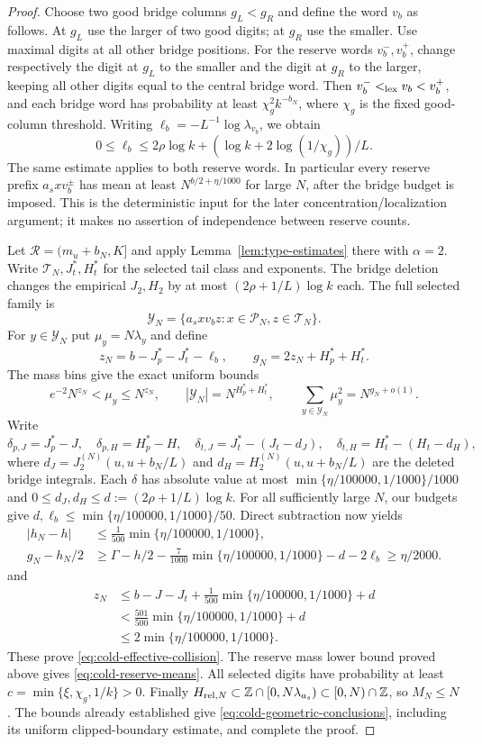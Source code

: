 \documentclass[11pt]{article}
\numberwithin{equation}{section}
\theoremstyle{definition}
\theoremstyle{remark}
\newcommand{\1}{\mathbf 1}
\begin{document}
\begin{proof}
Choose two good bridge columns $g_L<g_R$ and define the word $v_b$ as follows.
At $g_L$ use the larger of two good digits; at $g_R$ use the smaller.
Use maximal digits at all other bridge positions.
For the reserve words $v_b^-,v_b^+$, change respectively the digit at
$g_L$ to the smaller and the digit at $g_R$ to the larger, keeping all
other digits equal to the central bridge word.
Then $v_b^-<_{\rm lex}v_b<v_b^+$, and each bridge word has probability at least
$\chi_g^2k^{-b_N}$, where $\chi_g$ is the fixed good-column threshold.
Writing $\ell_b=-L^{-1}\log\lambda_{v_b}$, we obtain
\[
 0\le\ell_b\le 2\rho\log k+(\log k+2\log(1/\chi_g))/L.
\]
The same estimate applies to both reserve words.  In particular every
reserve prefix $a_sxv_b^\pm$ has mean at least
$N^{b/2+\eta/1000}$ for large $N$, after the bridge budget is imposed.
This is the deterministic input for the later concentration/localization
argument; it makes no assertion of independence between reserve counts.

Let $\mathcal R=(m_u+b_N,K]$ and apply
Lemma~\ref{lem:type-estimates} there with $\alpha=2$.
Write $\mathcal T_N,J_t^*,H_t^*$ for the selected tail class and exponents.
The bridge deletion changes the empirical $J_2,H_2$ by at most
$(2\rho+1/L)\log k$ each.
The full selected family is
\[
 \mathcal Y_N=\{a_sxv_bz:x\in\mathcal P_N, z\in\mathcal T_N\}.
\]
For $y\in\mathcal Y_N$ put $\mu_y=N\lambda_y$ and define
\[
 z_N=b-J_p^*-J_t^*-\ell_b,\qquad
 g_N=2z_N+H_p^*+H_t^*.
\]
The mass bins give the exact uniform bounds
\[
 e^{-2}N^{z_N}<\mu_y\le N^{z_N},\qquad
 |\mathcal Y_N|=N^{H_p^*+H_t^*},\qquad
 \sum_{y\in\mathcal Y_N}\mu_y^2=N^{g_N+o(1)}.
\]
Write
\[
 \delta_{p,J}=J_p^*-J,\quad \delta_{p,H}=H_p^*-H,\quad
 \delta_{t,J}=J_t^*-(J_t-d_J),\quad
 \delta_{t,H}=H_t^*-(H_t-d_H),
\]
where $d_J=J_2^{(N)}(u,u+b_N/L)$ and
$d_H=H_2^{(N)}(u,u+b_N/L)$ are the deleted bridge integrals.
Each $\delta$ has absolute value at most $\min\{\eta/100000,1/1000\}/1000$ and
$0\le d_J,d_H\le d:=(2\rho+1/L)\log k$.
For all sufficiently large $N$, our budgets give
$d,\ell_b\le\min\{\eta/100000,1/1000\}/50$. Direct subtraction now yields
\begin{align*}
 |h_N-h|&\le\frac1{500}\min\{\eta/100000,1/1000\},\\
 g_N-h_N/2&\ge\Gamma-h/2
   -\frac7{1000}\min\{\eta/100000,1/1000\}-d-2\ell_b
   \ge\eta/2000.
\end{align*}
and
\begin{align*}
 z_N&\le b-J-J_t+\frac1{500}\min\{\eta/100000,1/1000\}+d\\
    &<\frac{501}{500}\min\{\eta/100000,1/1000\}+d\\
    &\le2\min\{\eta/100000,1/1000\}.
\end{align*}
These prove \eqref{eq:cold-effective-collision}. The reserve mass lower
bound proved above gives \eqref{eq:cold-reserve-means}.
All selected digits have probability at least
$c=\min\{\xi,\chi_g,1/k\}>0$. Finally
$H_{{\rm rel},N}\subset\mathbb Z\cap[0,N\lambda_{a_s})\subset[0,N)\cap\mathbb Z$,
so $M_N\le N$. The bounds already established give
\eqref{eq:cold-geometric-conclusions}, including its uniform clipped-boundary
estimate, and complete the proof.
\end{proof}
\end{document}
